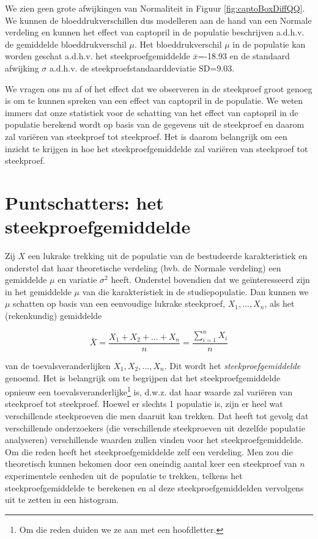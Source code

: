 \documentclass[
  12pt,dutch,coursenotes]{book}
\theoremstyle{definition}
\theoremstyle{definition}
\theoremstyle{definition}
\theoremstyle{remark}
\begin{document}
We zien geen grote afwijkingen van Normaliteit in Figuur \ref{fig:captoBoxDiffQQ}.
We kunnen de bloeddrukverschillen dus modelleren aan de hand van een Normale verdeling en kunnen het effect van captopril in de populatie beschrijven a.d.h.v. de gemiddelde bloeddrukverschil \(\mu\).
Het bloeddrukverschil \(\mu\) in de populatie kan worden geschat a.d.h.v. het steekproefgemiddelde \(\bar x\)=-18.93 en de standaard afwijking \(\sigma\) a.d.h.v. de steekproefstandaarddeviatie \(\text{SD}\)=9.03.

We vragen ons nu af of het effect dat we observeren in de steekproef groot genoeg is om te kunnen spreken van een effect van captopril in de populatie.
We weten immers dat onze statistiek voor de schatting van het effect van captopril in de populatie berekend wordt op basis van de gegevens uit de steekproef en daarom zal variëren van steekproef tot steekproef.
Het is daarom belangrijk om een inzicht te krijgen in hoe het steekproefgemiddelde zal variëren van steekproef tot steekproef.

\hypertarget{puntschatters-het-steekproefgemiddelde}{%
\section{Puntschatters: het steekproefgemiddelde}\label{puntschatters-het-steekproefgemiddelde}}

Zij \(X\) een lukrake trekking uit de populatie van de bestudeerde karakteristiek en onderstel dat haar theoretische verdeling (bvb. de Normale verdeling) een gemiddelde \(\mu\) en variatie \(\sigma^2\) heeft.
Onderstel bovendien dat we geïnteresseerd zijn in het gemiddelde \(\mu\) van die karakteristiek in de studiepopulatie.
Dan kunnen we \(\mu\) schatten op basis van een eenvoudige lukrake steekproef, \(X_1,...,X_n\), als het (rekenkundig) gemiddelde

\begin{equation*}
\bar X = \frac{X_1+ X_2+ ... + X_n}{n} = \frac{\sum_{i=1}^{n} X_i}{n}
\end{equation*}

van de toevalsveranderlijken \(X_1,X_2, ..., X_n\).
Dit wordt het \emph{steekproefgemiddelde} genoemd.
Het is belangrijk om te begrijpen dat het
steekproefgemiddelde opnieuw een toevalsveranderlijke\footnote{Om die reden duiden we ze aan met een hoofdletter.} is, d.w.z. dat haar
waarde zal variëren van steekproef tot steekproef. Hoewel er
slechts 1 populatie is, zijn er heel wat verschillende steekproeven die men
daaruit kan trekken. Dat heeft tot gevolg dat verschillende onderzoekers
(die verschillende steekproeven uit dezelfde populatie analyseren)
verschillende waarden zullen vinden voor het steekproefgemiddelde. Om die
reden heeft het steekproefgemiddelde zelf een verdeling.
Men zou die theoretisch kunnen bekomen door een oneindig aantal keer een steekproef van \(n\) experimentele eenheden uit de populatie te trekken, telkens het steekproefgemiddelde te berekenen en al deze steekproefgemiddelden vervolgens uit te zetten in een histogram.
\end{document}
